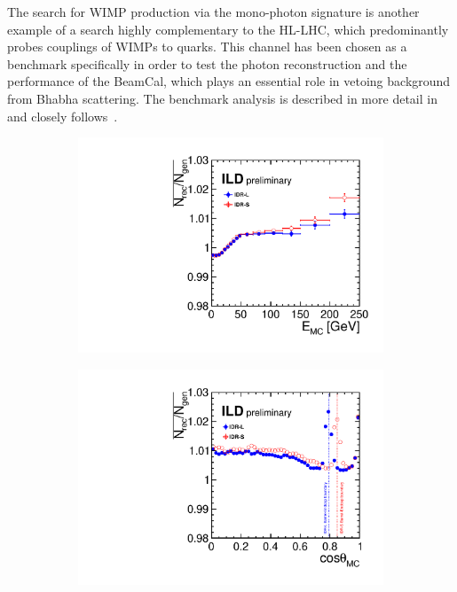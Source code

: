 The search for WIMP production via the mono-photon signature is another example of a search highly complementary to the HL-LHC, which predominantly probes couplings of WIMPs to quarks. This channel has been chosen as a  benchmark specifically in order to test the photon reconstruction and the performance of the BeamCal, which plays an essential role in vetoing background from Bhabha scattering. The benchmark analysis is described in more detail in~\cite{ILDNote:WIMPs} and closely follows~\cite{Habermehl:2018yul}.
\begin{figure}[htbp]
\begin{subfigure}{0.49\hsize} 
\includegraphics[width=\textwidth]{Performance/fig/NrecNgenE_photon_IDR_wo_cosTheta08.pdf}
 \caption{ \label{fig:WIMP:Ngamma:Egood}}
 \end{subfigure}
\begin{subfigure}{0.49\hsize} 
\includegraphics[width=\textwidth]{Performance/fig/NrecNgenCosTheta_allpfo_IDR.pdf}

\end{subfigure}
\end{figure}
